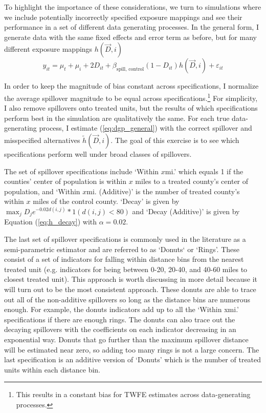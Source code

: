 \documentclass[11pt]{article}
\begin{document}
To highlight the importance of these considerations, we turn to simulations where we include potentially incorrectly specified exposure mappings and see their performance in a set of different data generating processes. In the general form, I generate data with the same fixed effects and error term as before, but for many different exposure mappings $h(\vec{D}, i)$ 
\begin{equation}\label{eq:dgp_general}
    y_{it} = \mu_t + \mu_i + 2 D_{it} + \beta_{\text{spill, control}} (1-D_{it}) h(\vec{D}, i) + \varepsilon_{it}   
\end{equation}

In order to keep the magnitude of bias constant across specifications, I normalize the average spillover magnitude to be equal across specifications.\footnote{This results in a constant bias for TWFE estimates across data-generating processes.} For simplicity, I also remove spillovers onto treated units, but the results of which specifications perform best in the simulation are qualitatively the same. For each true data-generating process, I estimate (\ref{eq:dgp_general}) with the correct spillover and misspecified alternatives $\tilde{h}(\vec{D}, i)$. The goal of this exercise is to see which specifications perform well under broad classes of spillovers.

The set of spillover specifications include `Within $x$mi.' which equals 1 if the counties' center of population is within $x$ miles to a treated county's center of population, and `Within $x$mi. (Additive)' is the number of treated county's within $x$ miles of the control county. `Decay' is given by $\max_j D_j e^{-0.02 d(i,j)} * 1(d(i,j) < 80)$ and `Decay (Additive)' is given by Equation (\ref{eq:h_decay}) with $\alpha = 0.02$. 

The last set of spillover specifications is commonly used in the literature as a semi-parametric estimator and are referred to as `Donuts` or `Rings'. These consist of a set of indicators for falling within distance bins from the nearest treated unit (e.g. indicators for being between 0-20, 20-40, and 40-60 miles to closest treated unit). This approach is worth discussing in more detail because it will turn out to be the most consistent approach. These donuts are able to trace out all of the non-additive spillovers so long as the distance bins are numerous enough. For example, the donuts indicators add up to all the `Within xmi.' specifications if there are enough rings. The donuts can also trace out the decaying spillovers with the coefficients on each indicator decreasing in an exponential way. Donuts that go further than the maximum spillover distance will be estimated near zero, so adding too many rings is not a large concern. The last specification is an additive version of `Donuts' which is the number of treated units within each distance bin.
\end{document}
